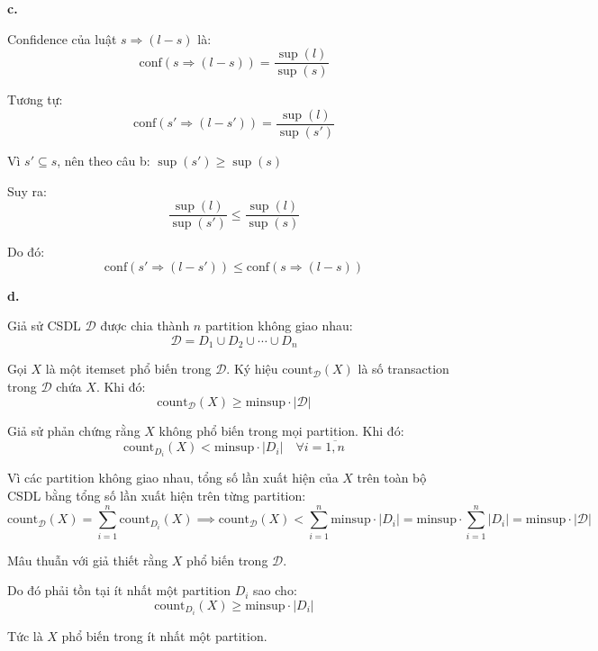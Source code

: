 \bigskip

\noindent \textbf{c.}

Confidence của luật $s \Rightarrow (l-s)$ là:
\[
    \mathrm{conf}(s \Rightarrow (l-s))=\frac{\sup(l)}{\sup(s)}
\]

Tương tự:
\[
    \mathrm{conf}(s' \Rightarrow (l-s'))
    =
    \frac{\sup(l)}{\sup(s')}
\]

Vì $s' \subseteq s$, nên theo câu b: $\sup(s')\ge \sup(s)$

Suy ra:
\[
    \frac{\sup(l)}{\sup(s')}
    \le
    \frac{\sup(l)}{\sup(s)}
\]

Do đó:
\[
    \mathrm{conf}(s' \Rightarrow (l-s'))
    \le
    \mathrm{conf}(s \Rightarrow (l-s))
\]

\bigskip

\noindent \textbf{d.}

Giả sử CSDL $\mathcal{D}$ được chia thành $n$ partition không giao nhau:
\[
    \mathcal{D}=D_1\cup D_2\cup \cdots \cup D_n
\]

Gọi $X$ là một itemset phổ biến trong $\mathcal{D}$. Ký hiệu $\mathrm{count}_{\mathcal{D}}(X)$ là số transaction trong $\mathcal{D}$ chứa $X$. Khi đó:
\[
    \mathrm{count}_{\mathcal{D}}(X)\ge \mathrm{minsup}\cdot |\mathcal{D}|
\]

Giả sử phản chứng rằng $X$ không phổ biến trong mọi partition. Khi đó:
\[
    \mathrm{count}_{D_i}(X)<\mathrm{minsup}\cdot |D_i|
    \quad \forall i = \overline{1,n}
\]

Vì các partition không giao nhau, tổng số lần xuất hiện của $X$ trên toàn bộ CSDL bằng tổng số lần xuất hiện trên từng partition:
\[
    \mathrm{count}_{\mathcal{D}}(X)
    =
    \sum_{i=1}^{n}\mathrm{count}_{D_i}(X)
    \implies
    \mathrm{count}_{\mathcal{D}}(X)
    <
    \sum_{i=1}^{n}\mathrm{minsup}\cdot |D_i|
    =
    \mathrm{minsup}\cdot \sum_{i=1}^{n}|D_i|
    =
    \mathrm{minsup}\cdot |\mathcal{D}|
\]

Mâu thuẫn với giả thiết rằng $X$ phổ biến trong $\mathcal{D}$.

Do đó phải tồn tại ít nhất một partition $D_i$ sao cho:
\[
    \mathrm{count}_{D_i}(X)\ge \mathrm{minsup}\cdot |D_i|
\]

Tức là $X$ phổ biến trong ít nhất một partition.
